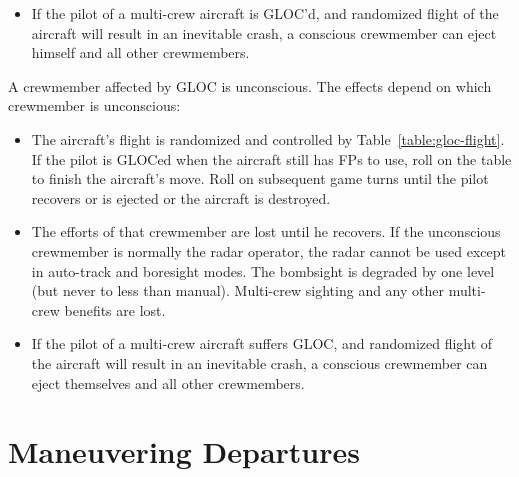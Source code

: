\begin{advancedrules}
{\begin{itemize}
    \item{} If the pilot of a multi-crew aircraft is GLOC'd, and randomized flight of the aircraft will result in an inevitable crash, a conscious crewmember can eject himself and all other crewmembers.

\end{itemize}
}{
A crewmember affected by GLOC is unconscious. The effects depend on which crewmember is unconscious:

\begin{itemize}

    \item{} The aircraft's flight is randomized and controlled by Table~\ref{table:gloc-flight}. If the pilot is GLOCed when the aircraft still has FPs to use, roll on the table to finish the aircraft's move. Roll on subsequent game turns until the pilot recovers or is ejected or the aircraft is destroyed.

    \item{} The efforts of that crewmember are lost until he recovers. If the unconscious crewmember is normally the radar operator, the radar cannot be used except in auto-track and boresight modes. The bombsight is degraded by one level (but never to less than manual). Multi-crew sighting and any other multi-crew benefits are lost.

    \item{} If the pilot of a multi-crew aircraft suffers GLOC, and randomized flight of the aircraft will result in an inevitable crash, a conscious crewmember can eject themselves and all other crewmembers.
\end{itemize}
}

\section{Maneuvering Departures}
\label{rule:maneuvering-departures}

\end{advancedrules}
